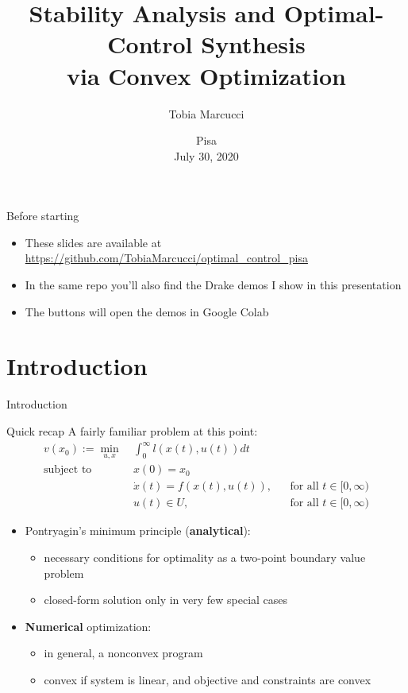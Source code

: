 \documentclass[aspectratio=169]{beamer}
\title[Stability and Control Synthesis via Convex Optimization]{Stability Analysis and Optimal-Control Synthesis \\ via Convex Optimization}
\author{Tobia Marcucci}
\institute{\textit{tobiam@mit.edu}}
\date{Pisa \\ July 30, 2020}
\begin{document}
\begin{frame}
\titlepage
\end{frame}

\begin{frame}{Before starting}
\begin{itemize}
\item
These slides are available at \href{https://github.com/TobiaMarcucci/optimal_control_pisa}{{\color{blue}https://github.com/TobiaMarcucci/optimal\_control\_pisa}}
\item
In the same repo you'll also find the Drake demos I show in this presentation
\item
The buttons  will open the demos in Google Colab
\end{itemize}
\end{frame}

\section{Introduction}
\begin{frame}
\huge
\centering
{\color{darkred} Introduction}
\end{frame}

\begin{frame}{Quick recap}
A fairly familiar problem at this point:
\begin{align*}
v(x_0) := \min_{u, x} \ &\int_0^\infty l(x(t), u(t)) dt \\
\text{subject to} \ & x(0) = x_0 \\
& \dot x(t) = f(x(t), u(t)), &&  \text{for all }t \in [0, \infty) \\
& u(t) \in U, &&  \text{for all }t \in [0, \infty)
\end{align*}
\pause
\vspace{-7mm}
\begin{itemize}
\item
Pontryagin's minimum principle (\textbf{analytical}):
\begin{itemize}
\item
necessary conditions for optimality as a two-point boundary value problem
\item
closed-form solution only in very few special cases
\end{itemize}
\item
\textbf{Numerical} optimization:
\begin{itemize}
\item
in general, a nonconvex program
\item
convex if system is linear, and objective and constraints are convex
\end{itemize}
\end{itemize}
\end{frame}
\end{document}
